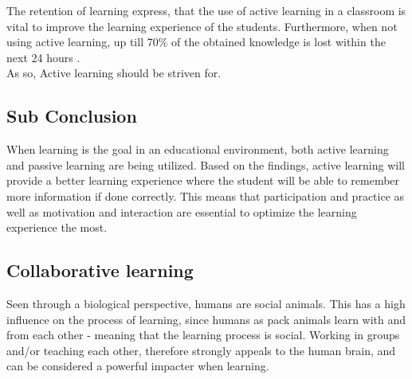 The retention of learning express, that the use of active learning in a classroom is vital to improve the learning experience of the students. Furthermore, when not using active learning, up till 70\% of the obtained knowledge is lost within the next 24 hours \cite{learning}.\\
As so, Active learning should be striven for.  
\\
\subsection*{Sub Conclusion}
When learning is the goal in an educational environment, both active learning and passive learning are being utilized. Based on the findings, active learning will provide a better learning experience where the student will be able to remember more information if done correctly. This means that participation and practice as well as motivation and interaction are essential to optimize the learning experience the most.

\subsection{Collaborative learning}\label{collabLearning}

Seen through a biological perspective, humans are social animals\cite{laeringIPraksis}. This has a high influence on the process of learning, since humans as pack animals learn with and from each other - meaning that the learning process is social\cite{laeringIPraksis}. Working in groups and/or teaching each other, therefore strongly appeals to the human brain, and can be considered a powerful impacter when learning\cite{laeringIPraksis}.        

